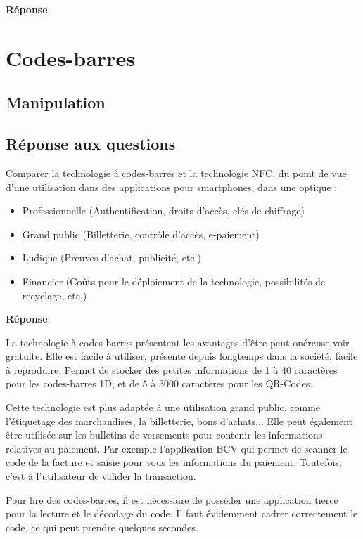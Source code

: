 \documentclass[francais,12pt]{article}
\begin{document}
	 {\color[rgb]{0,0.5,0.23}\textbf{Réponse}}
	 
	
	\section*{Codes-barres}
	\subsection*{Manipulation}
	\subsection*{Réponse aux questions}
	Comparer la technologie à codes-barres et la technologie NFC, du point de vue d'une utilisation dans des applications pour smartphones, dans une optique : 
	\begin{itemize}
		\item Professionnelle (Authentification, droits d’accès, clés de chiffrage)
		\item Grand public (Billetterie, contrôle d’accès, e-paiement) 
		\item Ludique (Preuves d'achat, publicité, etc.)
		\item Financier (Coûts pour le déploiement de la technologie, possibilités de recyclage, etc.) 
	\end{itemize}

	{\color[rgb]{0,0.5,0.23}\textbf{Réponse}}
	
	La technologie à codes-barres présentent les avantages d'être peut onéreuse voir gratuite. Elle est facile à utiliser, présente depuis longtemps dans la société, facile à reproduire. Permet de stocker des petites informations de 1 à 40 caractères pour les codes-barres 1D, et de 5 à 3000 caractères pour les QR-Codes. 

	Cette technologie est plus adaptée à une utilisation grand public, comme l’étiquetage des marchandises, la billetterie, bons d'achats... 
	Elle peut également être utilisée sur les bulletins de versements pour contenir les informations relatives au paiement. Par exemple l'application BCV qui permet de scanner le code de la facture et saisie pour vous les informations du paiement. Toutefois, c'est à l'utilisateur de valider la transaction.
	
	Pour lire des codes-barres, il est nécessaire de posséder une application tierce pour la lecture et le décodage du code. Il faut évidemment cadrer correctement le code, ce qui peut prendre quelques secondes.
	
\end{document}
